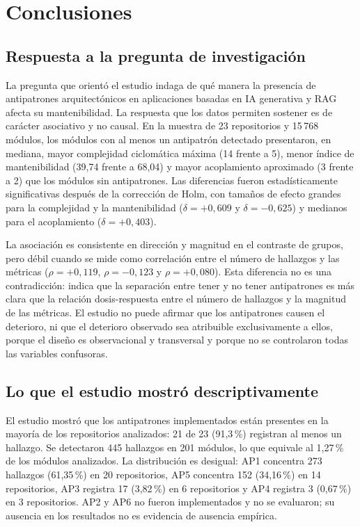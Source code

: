 \section{Conclusiones}

\subsection{Respuesta a la pregunta de investigación}

La pregunta que orientó el estudio indaga de qué manera la presencia de antipatrones arquitectónicos en aplicaciones basadas en IA generativa y RAG afecta su mantenibilidad. La respuesta que los datos permiten sostener es de carácter asociativo y no causal. En la muestra de 23 repositorios y 15\,768 módulos, los módulos con al menos un antipatrón detectado presentaron, en mediana, mayor complejidad ciclomática máxima (14 frente a 5), menor índice de mantenibilidad (39,74 frente a 68,04) y mayor acoplamiento aproximado (3 frente a 2) que los módulos sin antipatrones. Las diferencias fueron estadísticamente significativas después de la corrección de Holm, con tamaños de efecto grandes para la complejidad y la mantenibilidad ($\delta=+0{,}609$ y $\delta=-0{,}625$) y medianos para el acoplamiento ($\delta=+0{,}403$).

La asociación es consistente en dirección y magnitud en el contraste de grupos, pero débil cuando se mide como correlación entre el número de hallazgos y las métricas ($\rho=+0{,}119$, $\rho=-0{,}123$ y $\rho=+0{,}080$). Esta diferencia no es una contradicción: indica que la separación entre tener y no tener antipatrones es más clara que la relación dosis-respuesta entre el número de hallazgos y la magnitud de las métricas. El estudio no puede afirmar que los antipatrones causen el deterioro, ni que el deterioro observado sea atribuible exclusivamente a ellos, porque el diseño es observacional y transversal y porque no se controlaron todas las variables confusoras.

\subsection{Lo que el estudio mostró descriptivamente}

El estudio mostró que los antipatrones implementados están presentes en la mayoría de los repositorios analizados: 21 de 23 (91,3\,\%) registran al menos un hallazgo. Se detectaron 445 hallazgos en 201 módulos, lo que equivale al 1,27\,\% de los módulos analizados. La distribución es desigual: AP1 concentra 273 hallazgos (61,35\,\%) en 20 repositorios, AP5 concentra 152 (34,16\,\%) en 14 repositorios, AP3 registra 17 (3,82\,\%) en 6 repositorios y AP4 registra 3 (0,67\,\%) en 3 repositorios. AP2 y AP6 no fueron implementados y no se evaluaron; su ausencia en los resultados no es evidencia de ausencia empírica.

